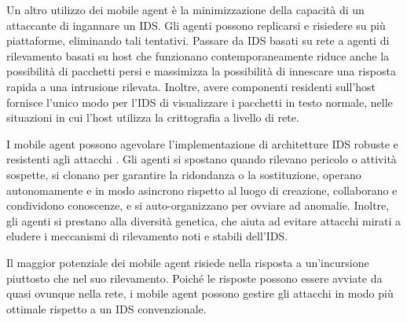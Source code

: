 Un altro utilizzo dei mobile agent è la minimizzazione della capacità di un attaccante di ingannare un IDS. Gli agenti possono replicarsi e risiedere su più piattaforme, eliminando tali tentativi. Passare da IDS basati su rete a agenti di rilevamento basati su host che funzionano contemporaneamente riduce anche la possibilità di pacchetti persi e massimizza la possibilità di innescare una risposta rapida a una intrusione rilevata. Inoltre, avere componenti residenti sull'host fornisce l'unico modo per l'IDS di visualizzare i pacchetti in testo normale, nelle situazioni in cui l'host utilizza la crittografia a livello di rete.

I mobile agent possono agevolare l'implementazione di architetture IDS robuste e resistenti agli attacchi \cite{mell2000denial}. Gli agenti si spostano quando rilevano pericolo o attività sospette, si clonano per garantire la ridondanza o la sostituzione, operano autonomamente e in modo asincrono rispetto al luogo di creazione, collaborano e condividono conoscenze, e si auto-organizzano per ovviare ad anomalie. Inoltre, gli agenti si prestano alla diversità genetica, che aiuta ad evitare attacchi mirati a eludere i meccanismi di rilevamento noti e stabili dell'IDS.

Il maggior potenziale dei mobile agent risiede nella risposta a un'incursione piuttosto che nel suo rilevamento. Poiché le risposte possono essere avviate da quasi ovunque nella rete, i mobile agent possono gestire gli attacchi in modo più ottimale rispetto a un IDS convenzionale.

